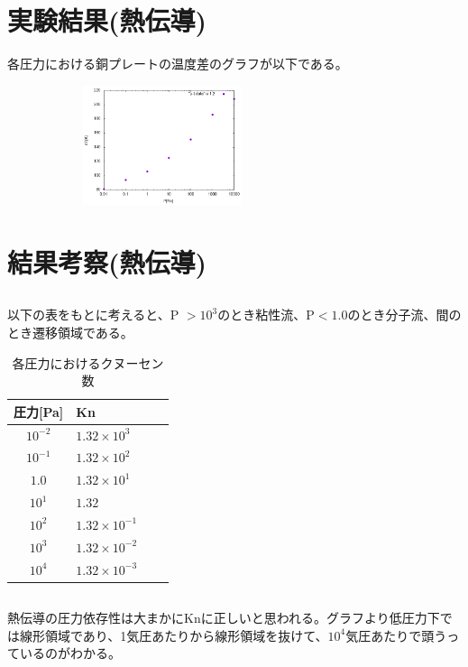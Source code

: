 \documentclass{jsarticle}
\begin{document}
\section{実験結果(熱伝導)}
各圧力における銅プレートの温度差のグラフが以下である。\\
\begin{figure}[htbp]
 \begin{center}
  \includegraphics[width=70mm,height=35mm]{pictures/p-t.png}
 \end{center}
 \label{fig:one}
\end{figure}
\section{結果考察(熱伝導)}
\subsection{}
以下の表をもとに考えると、P $>10^3$のとき粘性流、P$<1.0$のとき分子流、間のとき遷移領域である。
\begin{table}[h]
\caption{各圧力におけるクヌーセン数}
 \label{table:SpeedOfLight}
 \centering
  \begin{tabular}{clll}
   \hline
   圧力[Pa] & Kn \\
   \hline \hline
    $10^{-2}$ & $1.32\times10^{3}$ \\
    $10^{-1}$ & $1.32\times10^{2}$ \\
    $1.0$ & $1.32\times10^{1}$ \\
    $10^{1}$ & $1.32$ \\
    $10^{2}$ & $1.32\times10^{-1}$ \\
    $10^{3}$ & $1.32\times10^{-2}$ \\
    $10^{4}$ & $1.32\times10^{-3}$ \\
   \hline
  \end{tabular}
\end{table}
\subsection{}
熱伝導の圧力依存性は大まかにKnに正しいと思われる。グラフより低圧力下では線形領域であり、1気圧あたりから線形領域を抜けて、$10^{4}$気圧あたりで頭うっているのがわかる。
\end{document}
